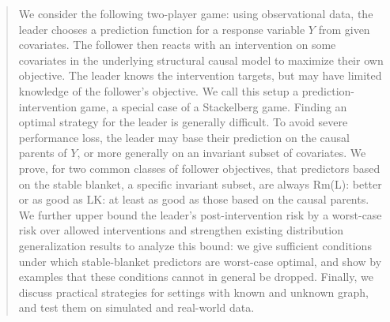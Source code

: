 \documentclass{article}
\newcommand{\jonas}[1]{\textcolor{myorange}{JP: #1}}
\newcommand{\rmj}[1]{\textcolor{gray}{Rm(J): #1}}
\newcommand{\linus}[1]{{\color{mygreen}LK: #1}}
\newcommand{\rml}[1]{{\color{gray}Rm(L): #1}}
\begin{document}
\begin{abstract}
We consider the following two-player game: using observational data, the leader chooses a prediction function for a response variable $Y$ from given covariates. The follower then reacts with an intervention on some covariates in the underlying structural causal model to maximize their own objective. The leader knows the intervention targets, but may have limited knowledge of the follower's objective. We call this setup a prediction-intervention game, a special case of a Stackelberg game. Finding an optimal strategy for the leader is generally difficult. To avoid severe performance loss, the leader may base their prediction on the causal parents of $Y$, or more generally on an invariant subset of covariates. We prove,
for two common classes of follower objectives,
that predictors based on the stable blanket, a specific invariant subset, 
are always \rml{better or as good as} \linus{at least as good as}
those based on the causal parents.
We further upper bound the leader's post-intervention risk by a worst-case risk over allowed interventions and strengthen existing distribution generalization results to analyze this bound: we give sufficient conditions under which stable-blanket predictors are worst-case optimal, and show by examples that these conditions cannot in general be dropped. Finally, we discuss practical strategies %
for settings with known and unknown graph, and test them on simulated and real-world data.
\end{abstract}





\end{document}
